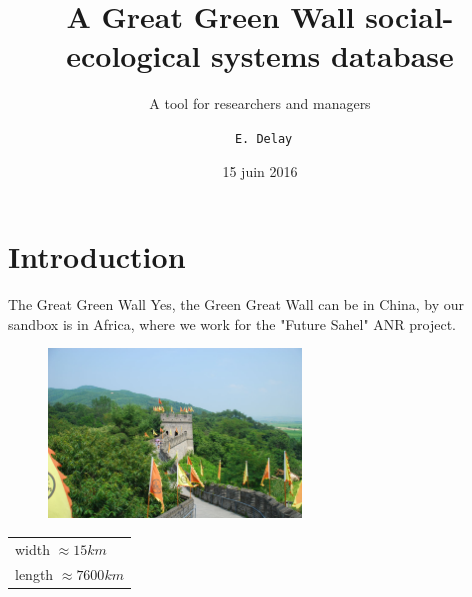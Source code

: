 \documentclass[newPxFont]{beamer}
\title{A Great Green Wall social-ecological systems database}
\subtitle{A tool for researchers and managers}
\date{15 juin 2016}
\author{\texttt{ E. Delay}}
\institute{\textsc{Ohm} Téssékéré - Sénégal}
\newcommand{\tabitem}{%
  \usebeamertemplate{itemize item}\hspace*{\labelsep}}
\begin{document}
%
%

\maketitle


%
%


\section{Introduction}

\begin{frame}[c]{The Great Green Wall}
\vspace{-1cm}
Yes, the Green Great Wall can be in China, by our sandbox is in Africa, where we work for the "Future Sahel" ANR project.
\begin{figure}
	\centering
	\includegraphics[width = 0.6\textwidth]{img/great_wall}
\end{figure}
\begin{center}
    \begin{tabular}{@{}l@{}}
       \\
      \tabitem width $\approx 15 km$ \\
      \tabitem length $\approx 7600km$
  \end{tabular}
\end{center}
\end{frame}
\end{document}
